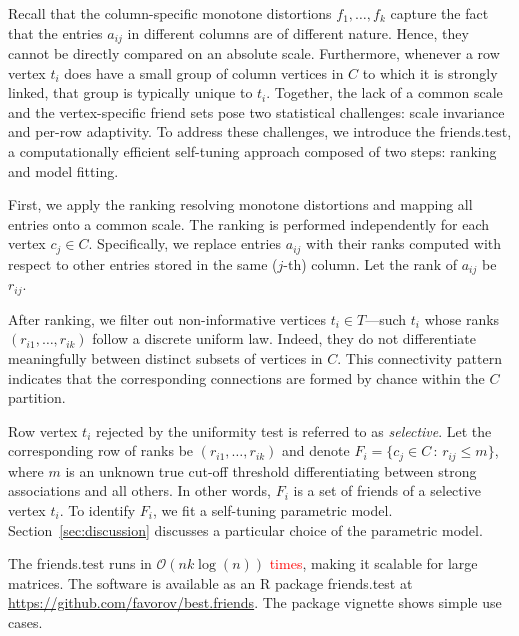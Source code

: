 \documentclass{llncs}
\newcommand{\red}[1]{\textcolor{red}{#1}}
\begin{document}
Recall that the column-specific monotone distortions $f_1, \dots, f_k$ capture the fact that the entries $a_{ij}$ in different columns are of different nature. Hence, they cannot be directly compared on an absolute scale. Furthermore, whenever a row vertex $t_i$ does have a small group of column vertices in $C$ to which it is strongly linked, that group is typically unique to $t_i$. Together, the lack of a common scale and the vertex-specific friend sets pose two statistical challenges: scale invariance and per-row adaptivity. To address these challenges, we introduce the \textsf{friends.test}, a computationally efficient self-tuning approach composed of two steps: ranking and model fitting.

First, we apply the ranking resolving monotone distortions and mapping all entries onto a common scale. The ranking is performed independently for each vertex $c_j \in C$. Specifically, we replace entries $a_{ij}$ with their ranks computed with respect to other entries stored in the same ($j$-th) column. Let the rank of $a_{ij}$ be $r_{ij}$. 

After ranking, we filter out non-informative vertices $t_i \in T$---such $t_i$ whose ranks $(r_{i1}, \dots, r_{ik})$ follow a discrete uniform law. Indeed, they do not differentiate meaningfully between distinct subsets of vertices in $C$.  This connectivity pattern indicates that the corresponding connections are formed by chance within the $C$ partition.

Row vertex $t_i$ rejected by the uniformity test is referred to as \textit{selective}. Let the corresponding row of ranks be $(r_{i1}, \dots, r_{ik})$ and denote $F_i = \{c_j\in C\, :\, r_{ij} \le m\}$, where $m$ is an unknown true cut-off threshold differentiating between strong associations and all others. In other words, $F_i$ is a set of friends of a selective vertex $t_i$. To identify $F_i$, we fit a self-tuning parametric model. Section~\ref{sec:discussion} discusses a particular choice of the parametric model.

The \textsf{friends.test} runs in $\mathcal{O}(nk\log(n))$ \red{times}, making it scalable for large matrices. The software is available as an \textsf{R} package \textsf{friends.test} at\\ 
\url{https://github.com/favorov/best.friends}. The package vignette shows simple use cases.


\end{document}

